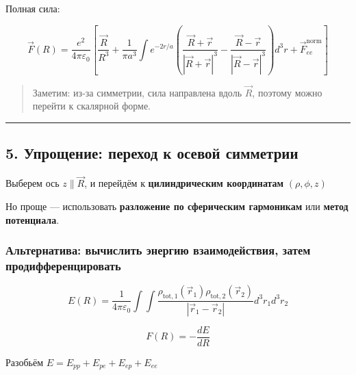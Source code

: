 \documentclass[11pt]{article}
\begin{document}
Полная сила:

\[
\vec{F}(R) = \frac{e^2}{4\pi\varepsilon_0} \left[
\frac{\vec{R}}{R^3} + \frac{1}{\pi a^3} \int e^{-2r/a} \left( \frac{ \vec{R} + \vec{r} }{ |\vec{R} + \vec{r}|^3 } - \frac{ \vec{R} - \vec{r} }{ |\vec{R} - \vec{r}|^3 } \right) d^3r + \vec{F}_{ee}^{\text{norm}}
\right]
\]

\begin{quote}
Заметим: из-за симметрии, сила направлена вдоль \(\vec{R}\), поэтому
можно перейти к скалярной форме.
\end{quote}

\begin{center}\rule{0.5\linewidth}{\linethickness}\end{center}

\subsection{5. Упрощение: переход к осевой
симметрии}\label{ux443ux43fux440ux43eux449ux435ux43dux438ux435-ux43fux435ux440ux435ux445ux43eux434-ux43a-ux43eux441ux435ux432ux43eux439-ux441ux438ux43cux43cux435ux442ux440ux438ux438}

Выберем ось \(z \parallel \vec{R}\), и перейдём к \textbf{цилиндрическим
координатам} \((\rho, \phi, z)\)

Но проще --- использовать \textbf{разложение по сферическим гармоникам}
или \textbf{метод потенциала}.

\subsubsection{\texorpdfstring{Альтернатива: вычислить \textbf{энергию
взаимодействия}, затем
продифференцировать}{Альтернатива: вычислить энергию взаимодействия, затем продифференцировать}}\label{ux430ux43bux44cux442ux435ux440ux43dux430ux442ux438ux432ux430-ux432ux44bux447ux438ux441ux43bux438ux442ux44c-ux44dux43dux435ux440ux433ux438ux44e-ux432ux437ux430ux438ux43cux43eux434ux435ux439ux441ux442ux432ux438ux44f-ux437ux430ux442ux435ux43c-ux43fux440ux43eux434ux438ux444ux444ux435ux440ux435ux43dux446ux438ux440ux43eux432ux430ux442ux44c}

\[
E(R) = \frac{1}{4\pi\varepsilon_0} \int \int \frac{ \rho_{\text{tot},1}(\vec{r}_1) \rho_{\text{tot},2}(\vec{r}_2) }{ |\vec{r}_1 - \vec{r}_2| } d^3r_1 d^3r_2
\]

\[
F(R) = -\frac{dE}{dR}
\]

Разобьём \(E = E_{pp} + E_{pe} + E_{ep} + E_{ee}\)
\end{document}
